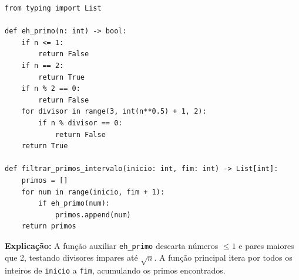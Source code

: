 \ifmostrarGabarito
\begin{verbatim}
from typing import List

def eh_primo(n: int) -> bool:
    if n <= 1:
        return False
    if n == 2:
        return True
    if n % 2 == 0:
        return False
    for divisor in range(3, int(n**0.5) + 1, 2):
        if n % divisor == 0:
            return False
    return True

def filtrar_primos_intervalo(inicio: int, fim: int) -> List[int]:
    primos = []
    for num in range(inicio, fim + 1):
        if eh_primo(num):
            primos.append(num)
    return primos
\end{verbatim}

\textbf{Explicação:}
A função auxiliar \texttt{eh\_primo} descarta números $\le 1$ e pares maiores que 2, testando divisores ímpares até $\sqrt{n}$. A função principal itera por todos os inteiros de \texttt{inicio} a \texttt{fim}, acumulando os primos encontrados.
\else
{}
\clearpage
{}
\clearpage
\fi

